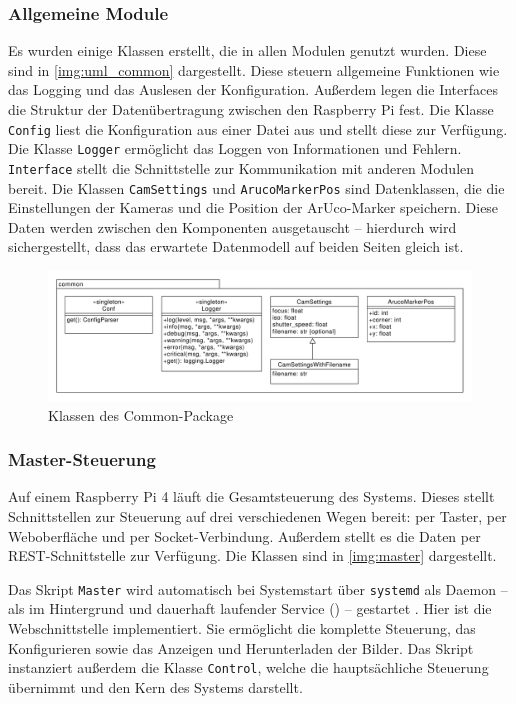 \documentclass[./00PhotoBox.tex]{subfiles}
\begin{document}
\subsubsection{Allgemeine Module}
Es wurden einige Klassen erstellt, die in allen Modulen genutzt wurden. Diese sind in \autoref{img:uml_common} dargestellt. Diese steuern allgemeine Funktionen wie das Logging und das Auslesen der Konfiguration. Außerdem legen die Interfaces die Struktur der Datenübertragung zwischen den Raspberry Pi fest. Die Klasse \texttt{Config} liest die Konfiguration aus einer Datei aus und stellt diese zur Verfügung. Die Klasse \texttt{Logger} ermöglicht das Loggen von Informationen und Fehlern. \texttt{Interface} stellt die Schnittstelle zur Kommunikation mit anderen Modulen bereit. Die Klassen \texttt{CamSettings} und \texttt{ArucoMarkerPos} sind Datenklassen, die die Einstellungen der Kameras und die Position der ArUco-Marker speichern. Diese Daten werden zwischen den Komponenten ausgetauscht -- hierdurch wird sichergestellt, dass das erwartete Datenmodell auf beiden Seiten gleich ist.

\begin{figure}
  \centering
  \includegraphics[width=1\textwidth]{./img/uml/uml_common_classdiagramm.pdf}
  \caption{Klassen des Common-Package} %
  \label{img:uml_common} %
\end{figure}


\subsubsection{Master-Steuerung}

Auf einem Raspberry Pi 4 läuft die Gesamt\-steuerung des Systems. Dieses stellt Schnitt\-stellen zur Steuerung auf drei verschiedenen Wegen bereit: per Taster, per Weboberfläche und per Socket-Verbindung. Außerdem stellt es die Daten per REST-Schnittstelle  zur Verfügung. Die Klassen sind in \autoref{img:master} dargestellt.

Das Skript \texttt{Master} wird automatisch bei Systemstart über \texttt{systemd} als Daemon -- als im Hintergrund und dauerhaft laufender Service (\citep[S. 369]{negus2020linux}) -- gestartet . Hier ist die Webschnittstelle implementiert. Sie ermöglicht die komplette Steuerung, das Konfigurieren sowie das Anzeigen und Herunterladen der Bilder. Das Skript instanziert außerdem die Klasse \texttt{Control}, welche die hauptsächliche Steuerung übernimmt und den Kern des Systems darstellt.
\end{document}
